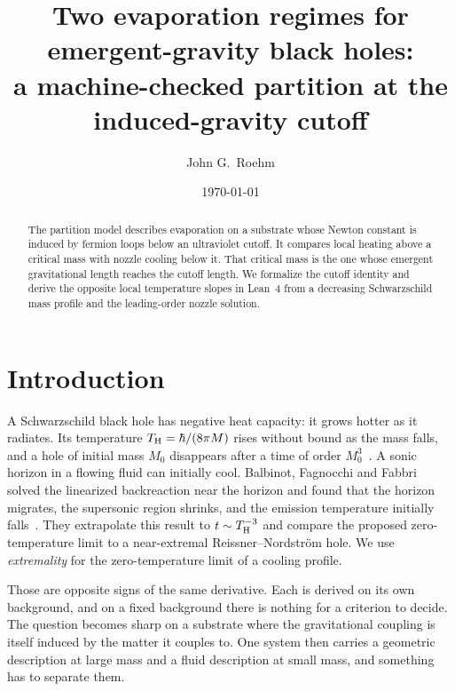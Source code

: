 \documentclass[aps,prl,reprint,nofootinbib,superscriptaddress]{revtex4-2}
\newcommand{\Thawk}{T_{\rm H}}
\begin{document}
\title{Two evaporation regimes for emergent-gravity black holes:\\
a machine-checked partition at the induced-gravity cutoff}

\author{John G.\ Roehm}

\date{\today}

\begin{abstract}
The partition model describes evaporation on a substrate whose Newton
constant is induced by fermion loops below an ultraviolet cutoff. It
compares local heating above a critical mass with nozzle cooling
below it. That critical mass is the one whose emergent gravitational length reaches the
cutoff length. We formalize the cutoff identity and derive the opposite local
temperature slopes in Lean~4 from a decreasing Schwarzschild mass
profile and the leading-order nozzle solution.
\end{abstract}

\maketitle

\section{Introduction}
\label{sec:intro}

A Schwarzschild black hole has negative heat capacity: it grows hotter as
it radiates. Its temperature $\Thawk = \hbar/(8\pi M)$ rises without bound
as the mass falls, and a hole of initial mass $M_0$ disappears after a time
of order $M_0^{3}$~\cite{Hawking1975CMP}. A sonic horizon in a flowing
fluid can initially cool. Balbinot, Fagnocchi and Fabbri solved the
linearized backreaction near the horizon and found that the horizon
migrates, the supersonic region shrinks, and the emission temperature
initially falls~\cite{Balbinot2005PRD}. They extrapolate this result to
$t \sim \Thawk^{-3}$ and compare the proposed zero-temperature limit to a
near-extremal Reissner--Nordstr\"om hole. We use \emph{extremality} for
the zero-temperature limit of a cooling profile.

Those are opposite signs of the same derivative. Each is derived on its own
background, and on a fixed background there is nothing for a criterion to
decide. The question becomes sharp on a substrate where the gravitational
coupling is itself induced by the matter it couples to. One system then
carries a geometric description at large mass and a fluid description at
small mass, and something has to separate them.
\end{document}
